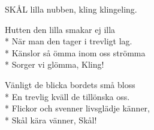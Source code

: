 \begin{SongText}
\begin{SongVerse}
        SKÅL lilla nubben, kling klingeling.
    \end{SongVerse}
    \begin{SongVerse}
        Hutten den lilla smakar ej illa\\*%
        När man den tager i trevligt lag.\\*%
        Känslor så ömma inom oss strömma\\*%
        Sorger vi glömma, Kling!
    \end{SongVerse}
    \begin{SongVerse}
        Vänligt de blicka bordets små bloss\\*%
        En trevlig kväll de tillönska oss.\\*%
        Flickor och svenner livsglädje känner,\\*%
        Skål kära vänner, Skål!
    \end{SongVerse}
\end{SongText}
